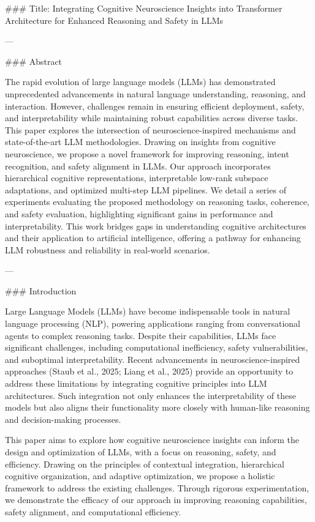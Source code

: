 ### Title: Integrating Cognitive Neuroscience Insights into Transformer Architecture for Enhanced Reasoning and Safety in LLMs

---

### Abstract

The rapid evolution of large language models (LLMs) has demonstrated unprecedented advancements in natural language understanding, reasoning, and interaction. However, challenges remain in ensuring efficient deployment, safety, and interpretability while maintaining robust capabilities across diverse tasks. This paper explores the intersection of neuroscience-inspired mechanisms and state-of-the-art LLM methodologies. Drawing on insights from cognitive neuroscience, we propose a novel framework for improving reasoning, intent recognition, and safety alignment in LLMs. Our approach incorporates hierarchical cognitive representations, interpretable low-rank subspace adaptations, and optimized multi-step LLM pipelines. We detail a series of experiments evaluating the proposed methodology on reasoning tasks, coherence, and safety evaluation, highlighting significant gains in performance and interpretability. This work bridges gaps in understanding cognitive architectures and their application to artificial intelligence, offering a pathway for enhancing LLM robustness and reliability in real-world scenarios.

---

### Introduction

Large Language Models (LLMs) have become indispensable tools in natural language processing (NLP), powering applications ranging from conversational agents to complex reasoning tasks. Despite their capabilities, LLMs face significant challenges, including computational inefficiency, safety vulnerabilities, and suboptimal interpretability. Recent advancements in neuroscience-inspired approaches (Staub et al., 2025; Liang et al., 2025) provide an opportunity to address these limitations by integrating cognitive principles into LLM architectures. Such integration not only enhances the interpretability of these models but also aligns their functionality more closely with human-like reasoning and decision-making processes.

This paper aims to explore how cognitive neuroscience insights can inform the design and optimization of LLMs, with a focus on reasoning, safety, and efficiency. Drawing on the principles of contextual integration, hierarchical cognitive organization, and adaptive optimization, we propose a holistic framework to address the existing challenges. Through rigorous experimentation, we demonstrate the efficacy of our approach in improving reasoning capabilities, safety alignment, and computational efficiency.

